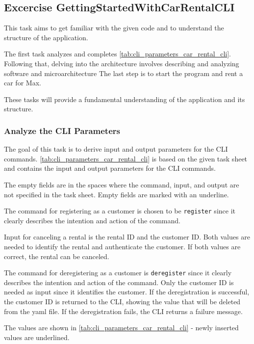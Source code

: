 \subsection{Excercise GettingStartedWithCarRentalCLI}
\label{sec:exercise_getting_started_with_car_rental_cli}
This task aims to get familiar with the given code and to understand the structure of the application.

The first task analyzes and completes \autoref{tab:cli_parameters_car_rental_cli}.
Following that, delving into the architecture involves describing and analyzing software and microarchitecture
The last step is to start the program and rent a car for Max.

These tasks will provide a fundamental understanding of the application and its structure.

\subsubsection*{Analyze the CLI Parameters}
The goal of this task is to derive input and output parameters for the CLI commands.
\autoref{tab:cli_parameters_car_rental_cli} is based on the given task sheet and contains the input and output parameters for the CLI commands.

The empty fields are in the spaces where the command, input, and output are not specified in the task sheet.
Empty fields are marked with an underline.

The command for registering as a customer is chosen to be \texttt{register} since it clearly describes the intention and action of the command.

Input for canceling a rental is the rental ID and the customer ID.
Both values are needed to identify the rental and authenticate the customer.
If both values are correct, the rental can be canceled.

The command for deregistering as a customer is \texttt{deregister} since it clearly describes the intention and action of the command.
Only the customer ID is needed as input since it identifies the customer.
If the deregistration is successful, the customer ID is returned to the CLI, showing the value that will be deleted from the yaml file.
If the deregistration fails, the CLI returns a failure message.

The values are shown in \autoref{tab:cli_parameters_car_rental_cli} - newly inserted values are underlined.

